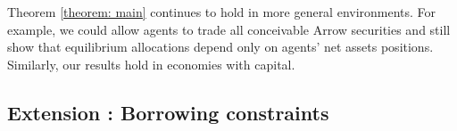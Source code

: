 \documentclass[thmsb,11pt]{article}
\begin{document}
Theorem \ref{theorem: main} continues to hold in more general environments. For example, we could allow
agents to trade all conceivable  Arrow securities and still show that  equilibrium
allocations depend only on agents' net assets positions.
Similarly, our results   hold in  economies with capital.
%

\subsection{Extension : Borrowing constraints}\label{Sec: extensions}
%
\end{document}
